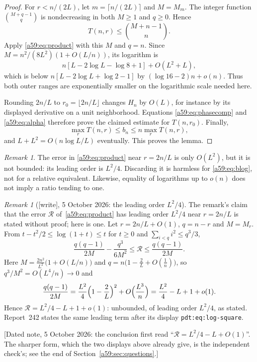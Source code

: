 \documentclass[11pt,letterpaper]{article}
\theoremstyle{remark}\newtheorem{remark}[theorem]{Remark}
\newcommand{\wtag}{\textup{[write]}}
\theoremstyle{remark}\newtheorem{wremark}{Remark}\renewcommand{\thewremark}{W\arabic{wremark}}
\theoremstyle{plain}\newtheorem{wcorollary}[wremark]{Corollary}
\begin{document}
\begin{proof}
For $r<n/(2L)$, let $m=\lceil n/(2L)\rceil$ and $M=M_m$. The integer function $\binom{M+q-1}{q}$ is nondecreasing in both $M\ge1$ and $q\ge0$. Hence
\[
 T(n,r)\le\binom{M+n-1}{n}.
\]
Apply \eqref{a59:eq:product} with this $M$ and $q=n$. Since
$M=n^2/(8L^2)(1+O(L/n))$, its logarithm is
\[
 n[L-2\log L-\log8+1]+O(L^2+L),
\]
which is below $n[L-2\log L+\log2-1]$ by
$(\log16-2)n+o(n)$. Thus both outer ranges are exponentially smaller on the logarithmic scale needed here.

Rounding $2n/L$ to $r_0=\lfloor2n/L\rfloor$ changes $H_n$ by $O(L)$, for instance by its displayed derivative on a unit neighborhood. Equations \eqref{a59:eq:phasecomp} and \eqref{a59:eq:alpha} therefore prove the claimed estimate for $T(n,r_0)$. Finally,
\[
 \max_r T(n,r)\le b_n\le n\max_r T(n,r),
\]
and $L+L^2=O(n\log L/L)$ eventually. This proves the lemma.
\end{proof}
\begin{remark}
The error in \eqref{a59:eq:product} near $r=2n/L$ is only $O(L^2)$, but it is not bounded: its leading order is $L^2/4$. Discarding it is harmless for \eqref{a59:eq:blog}, not for a relative equivalent. Likewise, equality of logarithms up to $o(n)$ does not imply a ratio tending to one.
\end{remark}

\begin{wremark}[\wtag, 5 October 2026: the leading order $L^2/4$]\label{a59:rem:Rlead}
The remark's claim that the error $\mathcal R$ of~\eqref{a59:eq:product} has
leading order $L^2/4$ near $r=2n/L$ is stated without proof; here is one.
Let $r=2n/L+O(1)$, $q=n-r$ and $M=M_r$. From $t-t^2/2\le\log(1+t)\le t$ for
$t\ge0$ and $\sum_{i<q}i^2\le q^3/3$,
\[
 \frac{q(q-1)}{2M}-\frac{q^3}{6M^2}\le\mathcal R\le\frac{q(q-1)}{2M}.
\]
Here $M=\frac{2n^2}{L^2}\bigl(1+O(L/n)\bigr)$ and
$q=n\bigl(1-\frac2L+O(\frac1n)\bigr)$, so $q^3/M^2=O(L^4/n)\to0$ and
\[
 \frac{q(q-1)}{2M}=\frac{L^2}4\Bigl(1-\frac2L\Bigr)^2+O\Bigl(\frac{L^3}n\Bigr)
 =\frac{L^2}4-L+1+o(1).
\]
Hence $\mathcal R=L^2/4-L+1+o(1)$: unbounded, of leading order $L^2/4$, as
stated. Report~242 states the same leading term after its display
\texttt{pdt:eq:log-square}.

[Dated note, 5 October 2026: the conclusion first read
``$\mathcal R=L^2/4-L+O(1)$''. The sharper form, which the two displays
above already give, is the independent check's; see the end of
Section~\ref{a59:sec:questions}.]
\end{wremark}
\end{document}
